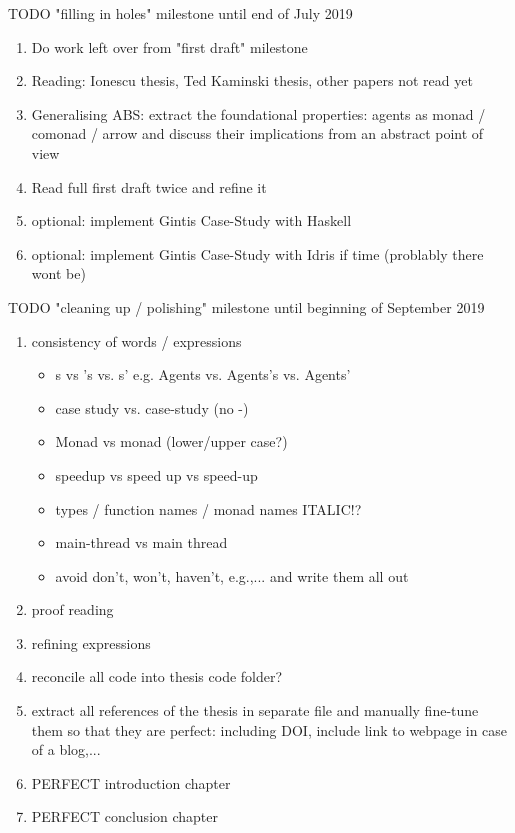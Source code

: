 \documentclass[oneside]{book}
\begin{document}
TODO "filling in holes" milestone until end of July 2019
\begin{enumerate}
	\item Do work left over from "first draft" milestone
	
	\item Reading: Ionescu thesis, Ted Kaminski thesis, other papers not read yet
	
	\item Generalising ABS: extract the foundational properties: agents as monad / comonad / arrow and discuss their implications from an abstract point of view

	\item Read full first draft twice and refine it
	
	\item optional: implement Gintis Case-Study with Haskell
	
	\item optional: implement Gintis Case-Study with Idris if time (problably there wont be)
\end{enumerate}

TODO "cleaning up / polishing" milestone until beginning of September 2019
\begin{enumerate}
	\item consistency of words / expressions
		\begin{itemize}
			\item s vs 's vs. s' e.g. Agents vs. Agents's vs. Agents'
			\item case study vs. case-study (no -)
			\item Monad vs monad (lower/upper case?)
			\item speedup vs speed up vs speed-up
			\item types / function names / monad names ITALIC!?
			\item main-thread vs main thread
			\item avoid don't, won't, haven't, e.g.,... and write them all out
		\end{itemize}
	\item proof reading

	\item refining expressions
	
	\item reconcile all code into thesis code folder?
	
	\item extract all references of the thesis in separate file and manually fine-tune them so that they are perfect: including DOI, include link to webpage in case of a blog,...
	
	\item PERFECT introduction chapter
	
	\item PERFECT conclusion chapter
\end{enumerate}
\end{document}
